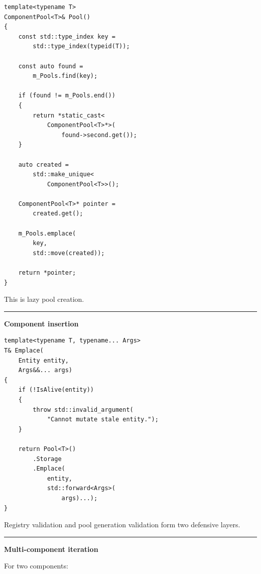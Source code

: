 \begin{verbatim}
template<typename T>
ComponentPool<T>& Pool()
{
    const std::type_index key =
        std::type_index(typeid(T));

    const auto found =
        m_Pools.find(key);

    if (found != m_Pools.end())
    {
        return *static_cast<
            ComponentPool<T>*>(
                found->second.get());
    }

    auto created =
        std::make_unique<
            ComponentPool<T>>();

    ComponentPool<T>* pointer =
        created.get();

    m_Pools.emplace(
        key,
        std::move(created));

    return *pointer;
}
\end{verbatim}

This is lazy pool creation.

\begin{center}\rule{0.5\linewidth}{0.5pt}\end{center}

\textbf{Component insertion}

\begin{verbatim}
template<typename T, typename... Args>
T& Emplace(
    Entity entity,
    Args&&... args)
{
    if (!IsAlive(entity))
    {
        throw std::invalid_argument(
            "Cannot mutate stale entity.");
    }

    return Pool<T>()
        .Storage
        .Emplace(
            entity,
            std::forward<Args>(
                args)...);
}
\end{verbatim}

Registry validation and pool generation validation form two defensive layers.

\begin{center}\rule{0.5\linewidth}{0.5pt}\end{center}

\textbf{Multi-component iteration}

For two components:

